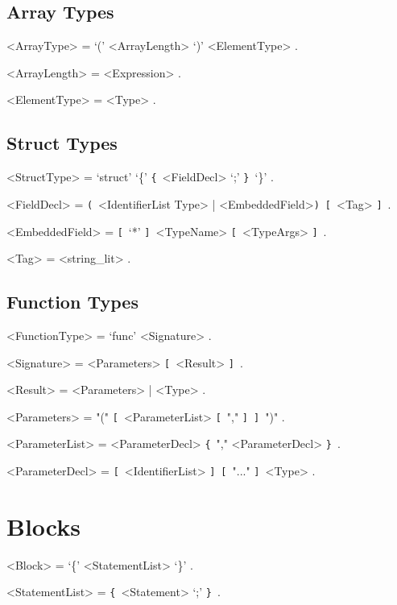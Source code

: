 \documentclass{article}
\def\lrep{\synshortsoff\texttt{\{}\synshorts~}
\def\rrep{\synshortsoff\texttt{\}}\synshorts~}
\def\lopt{\synshortsoff\texttt{[}\synshorts~}
\def\ropt{\synshortsoff\texttt{]}\synshorts~}
\def\lgrp{\synshortsoff\texttt{(}\synshorts~}
\def\rgrp{\synshortsoff\texttt{)}\synshorts~}
\begin{document}
\subsection*{Array Types}
\begin{grammar}
	<ArrayType> = `(' <ArrayLength> `)' <ElementType> .

	<ArrayLength> = <Expression> .
 
	<ElementType> = <Type> . 
\end{grammar}
 
\subsection*{Struct Types} 
\begin{grammar} 
	<StructType> = `struct' `\{'  \lrep <FieldDecl> `;'  \rrep `\}' .

	<FieldDecl> = \lgrp<IdentifierList Type> | <EmbeddedField>\rgrp \lopt <Tag> \ropt . 

	<EmbeddedField> = \lopt `*' \ropt <TypeName> \lopt <TypeArgs> \ropt .

	<Tag> = <string_lit> .  
\end{grammar}


\subsection*{Function Types} 
\begin{grammar} 
	<FunctionType> = `func' <Signature> .

	<Signature> = <Parameters> \lopt <Result> \ropt .

	<Result> = <Parameters> | <Type> .

	<Parameters> = "(" \lopt <ParameterList> \lopt "," \ropt \ropt ")" .

	<ParameterList> = <ParameterDecl> \lrep "," <ParameterDecl> \rrep .

	<ParameterDecl> = \lopt <IdentifierList> \ropt \lopt "..." \ropt <Type> .
\end{grammar}

\section*{Blocks} 
\begin{grammar} 
	<Block> = `\{' <StatementList> `\}' . 

	<StatementList> = \lrep <Statement> `;' \rrep .

\end{grammar}
\end{document}
